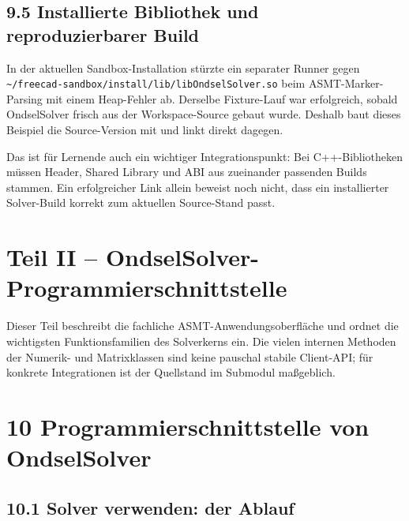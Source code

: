 \documentclass[
  12pt
]{book}
\begin{document}
\hypertarget{installierte-bibliothek-und-reproduzierbarer-build}{%
\section{\texorpdfstring{{9.5} Installierte Bibliothek und
reproduzierbarer
Build}{9.5 Installierte Bibliothek und reproduzierbarer Build}}\label{installierte-bibliothek-und-reproduzierbarer-build}}

In der aktuellen Sandbox-Installation stürzte ein separater Runner gegen
\texttt{\textasciitilde{}/freecad-sandbox/install/lib/libOndselSolver.so}
beim ASMT-Marker-Parsing mit einem Heap-Fehler ab. Derselbe Fixture-Lauf
war erfolgreich, sobald OndselSolver frisch aus der Workspace-Source
gebaut wurde. Deshalb baut dieses Beispiel die Source-Version mit und
linkt direkt dagegen.

Das ist für Lernende auch ein wichtiger Integrationspunkt: Bei
C++-Bibliotheken müssen Header, Shared Library und ABI aus zueinander
passenden Builds stammen. Ein erfolgreicher Link allein beweist noch
nicht, dass ein installierter Solver-Build korrekt zum aktuellen
Source-Stand passt.

\hypertarget{ondselsolver-programmierschnittstelle}{%
\chapter{\texorpdfstring{{Teil II --}
OndselSolver-Programmierschnittstelle}{Teil II -- OndselSolver-Programmierschnittstelle}}\label{ondselsolver-programmierschnittstelle}}

Dieser Teil beschreibt die fachliche ASMT-Anwendungsoberfläche und
ordnet die wichtigsten Funktionsfamilien des Solverkerns ein. Die vielen
internen Methoden der Numerik- und Matrixklassen sind keine pauschal
stabile Client-API; für konkrete Integrationen ist der Quellstand im
Submodul maßgeblich.

\hypertarget{kap-api-ueberblick}{%
\chapter{\texorpdfstring{{10} Programmierschnittstelle von
OndselSolver}{10 Programmierschnittstelle von OndselSolver}}\label{kap-api-ueberblick}}

\hypertarget{solver-verwenden-der-ablauf}{%
\section{\texorpdfstring{{10.1} Solver verwenden: der
Ablauf}{10.1 Solver verwenden: der Ablauf}}\label{solver-verwenden-der-ablauf}}
\end{document}
